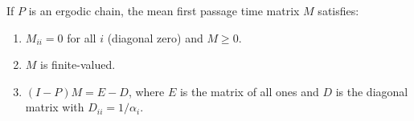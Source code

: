 If $P$ is an ergodic chain, the mean first passage time matrix $M$ satisfies:
\begin{enumerate}
\item[(1)] $M_{ii} = 0$ for all $i$ (diagonal zero) and $M \geq 0$.
\item[(2)] $M$ is finite-valued.
\item[(3)] $(I - P)M = E - D$, where $E$ is the matrix of all ones and $D$ is the diagonal matrix with $D_{ii} = 1/\alpha_i$.
\end{enumerate}
